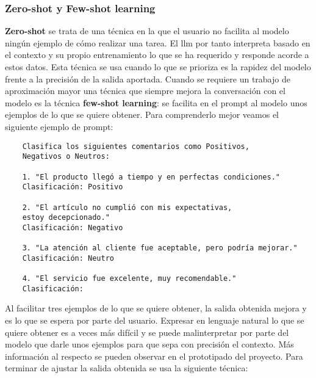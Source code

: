 \subsubsection{Zero-shot y Few-shot learning}
\textbf{Zero-shot} se trata de una técnica en la que el usuario no facilita al modelo ningún ejemplo de cómo realizar una tarea. El \acrshort{llm} por tanto interpreta basado en el contexto y su propio entrenamiento lo que se ha requerido y responde acorde a estos datos. Esta técnica se usa cuando lo que se prioriza es la rapidez del modelo frente a la precisión de la salida aportada. Cuando se requiere un trabajo de aproximación mayor una técnica que siempre mejora la conversación con el modelo es la técnica \textbf{few-shot learning}: se facilita en el prompt al modelo unos ejemplos de lo que se quiere obtener. Para comprenderlo mejor veamos el siguiente ejemplo de prompt: 
\begin{verbatim}
	Clasifica los siguientes comentarios como Positivos, 
	Negativos o Neutros:
	
	1. "El producto llegó a tiempo y en perfectas condiciones."
	Clasificación: Positivo
	
	2. "El artículo no cumplió con mis expectativas, 
	estoy decepcionado."
	Clasificación: Negativo
	
	3. "La atención al cliente fue aceptable, pero podría mejorar."
	Clasificación: Neutro
	
	4. "El servicio fue excelente, muy recomendable."
	Clasificación:
\end{verbatim}
Al facilitar tres ejemplos de lo que se quiere obtener, la salida obtenida mejora y es lo que se espera por parte del usuario. Expresar en lenguaje natural lo que se quiere obtener es a veces más difícil y se puede malinterpretar por parte del modelo que darle unos ejemplos para que sepa con precisión el contexto. Más información al respecto se pueden observar en el prototipado del proyecto. Para terminar de ajustar la salida obtenida se usa la siguiente técnica:

